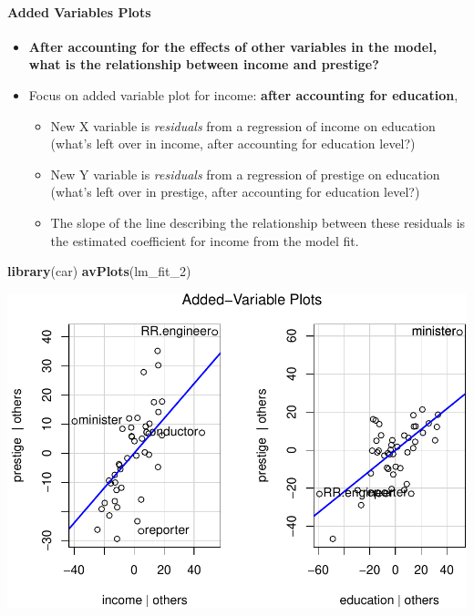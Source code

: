 \documentclass[]{extarticle}
\newenvironment{Shaded}{\begin{snugshade}}{\end{snugshade}}
\newcommand{\KeywordTok}[1]{\textcolor[rgb]{0.13,0.29,0.53}{\textbf{#1}}}
\newcommand{\DecValTok}[1]{\textcolor[rgb]{0.00,0.00,0.81}{#1}}
\newcommand{\NormalTok}[1]{#1}
\providecommand{\tightlist}{%
  \setlength{\itemsep}{0pt}\setlength{\parskip}{0pt}}
\let\oldparagraph\paragraph
\renewcommand{\paragraph}[1]{\oldparagraph{#1}\mbox{}}
\begin{document}
\vspace{4cm}

\paragraph{Added Variables Plots}\label{added-variables-plots}

\begin{itemize}
\tightlist
\item
  \textbf{After accounting for the effects of other variables in the
  model, what is the relationship between income and prestige?}
\item
  Focus on added variable plot for income: \textbf{after accounting for
  education},

  \begin{itemize}
  \tightlist
  \item
    New X variable is \emph{residuals} from a regression of income on
    education (what's left over in income, after accounting for
    education level?)
  \item
    New Y variable is \emph{residuals} from a regression of prestige on
    education (what's left over in prestige, after accounting for
    education level?)
  \item
    The slope of the line describing the relationship between these
    residuals is the estimated coefficient for income from the model
    fit.
  \end{itemize}
\end{itemize}

\begin{Shaded}
\begin{Highlighting}[]
\KeywordTok{library}\NormalTok{(car)}
\KeywordTok{avPlots}\NormalTok{(lm_fit_}\DecValTok{2}\NormalTok{)}
\end{Highlighting}
\end{Shaded}

\includegraphics{20190417_avPlots_files/figure-latex/unnamed-chunk-8-1.pdf}
\end{document}
